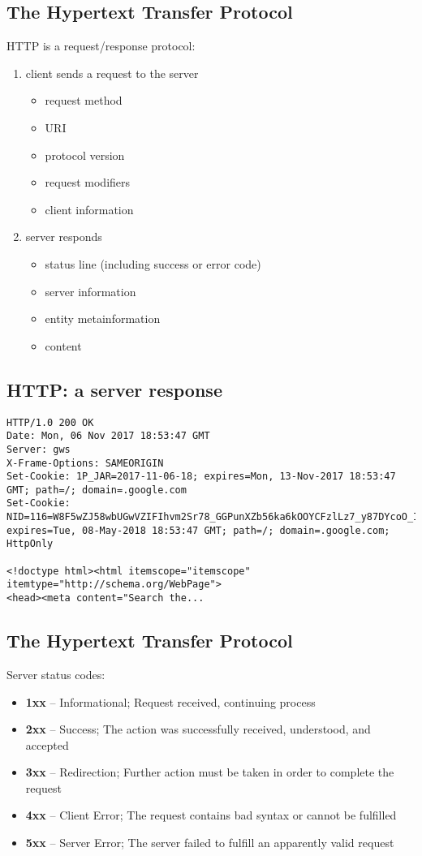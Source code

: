 \documentclass[xga]{xdvislides}
\begin{document}
\subsection{The Hypertext Transfer Protocol}
HTTP is a request/response protocol:
\begin{enumerate}
	\item client sends a request to the server
		\begin{itemize}
			\item request method
			\item URI
			\item protocol version
			\item request modifiers
			\item client information
		\end{itemize}
	\item server responds
		\begin{itemize}
			\item status line (including success or error code)
			\item server information
			\item entity metainformation
			\item content
		\end{itemize}
\end{enumerate}

\subsection{HTTP: a server response}
\begin{verbatim}
HTTP/1.0 200 OK
Date: Mon, 06 Nov 2017 18:53:47 GMT
Server: gws
X-Frame-Options: SAMEORIGIN
Set-Cookie: 1P_JAR=2017-11-06-18; expires=Mon, 13-Nov-2017 18:53:47 GMT; path=/; domain=.google.com
Set-Cookie: NID=116=W8F5wZJ58wbUGwVZIFIhvm2Sr78_GGPunXZb56ka6kOOYCFzlLz7_y87DYcoO_IOmUwgH4GZiY2WUAZut4YvDIqXcV3f4lFF93Y2ZYgzrjSo_7Irqbq4AS_CFsscmUrO;
expires=Tue, 08-May-2018 18:53:47 GMT; path=/; domain=.google.com; HttpOnly

<!doctype html><html itemscope="itemscope" itemtype="http://schema.org/WebPage">
<head><meta content="Search the...
\end{verbatim}

\subsection{The Hypertext Transfer Protocol}
Server status codes:
\begin{itemize}
	\item {\bf 1xx} -- Informational; Request received, continuing process
	\item {\bf 2xx} -- Success; The action was successfully received,
        understood, and accepted
	\item {\bf 3xx} -- Redirection; Further action must be taken in order to
        complete the request
	\item {\bf 4xx} -- Client Error; The request contains bad syntax or
		cannot be fulfilled
	\item {\bf 5xx} -- Server Error; The server failed to fulfill an
		apparently valid request
\end{itemize}
\end{document}
